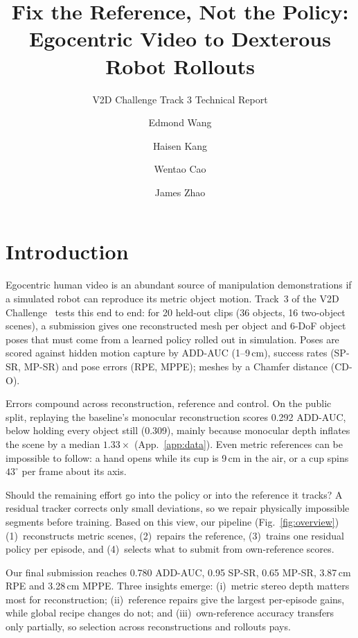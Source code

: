 \documentclass[10pt]{nvidiaextabstract}
\title{Fix the Reference, Not the Policy: Egocentric Video to Dexterous Robot Rollouts}
\subtitle{V2D Challenge Track 3 Technical Report}
\author[1*]{Edmond Wang}
\author[1*]{Haisen Kang}
\author[1*]{Wentao Cao}
\author[1*]{James Zhao}
\author[1]{\todo{Add remaining authors or remove}}
\affil[1]{Carnegie Mellon University}
\affil[ ]{\texttt{\{edmondwa, haisenk, wentaoc, jameszh2\}@andrew.cmu.edu}}
\begin{document}
\maketitle

\section{Introduction}
\label{sec:intro}

Egocentric human video is an abundant source of manipulation demonstrations if a simulated robot can reproduce its metric object motion. Track~3 of the V2D Challenge~\cite{v2d,v2ddata} tests this end to end: for 20 held-out clips (36 objects, 16 two-object scenes), a submission gives one reconstructed mesh per object and 6-DoF object poses that must come from a learned policy rolled out in simulation. Poses are scored against hidden motion capture by ADD-AUC (1--9\,cm), success rates (SP-SR, MP-SR) and pose errors (RPE, MPPE); meshes by a Chamfer distance (CD-O).

Errors compound across reconstruction, reference and control. On the public split, replaying the baseline's monocular reconstruction scores 0.292 ADD-AUC, below holding every object still (0.309), mainly because monocular depth inflates the scene by a median $1.33\times$ (App.~\ref{app:data}). Even metric references can be impossible to follow: a hand opens while its cup is 9\,cm in the air, or a cup spins $43^\circ$ per frame about its axis.

Should the remaining effort go into the policy or into the reference it tracks? A residual tracker corrects only small deviations, so we repair physically impossible segments before training. Based on this view, our pipeline (Fig.~\ref{fig:overview}) (1)~reconstructs metric scenes, (2)~repairs the reference, (3)~trains one residual policy per episode, and (4)~selects what to submit from own-reference scores.

Our final submission reaches 0.780 ADD-AUC, 0.95 SP-SR, 0.65 MP-SR, 3.87\,cm RPE and 3.28\,cm MPPE. Three insights emerge: (i)~metric stereo depth matters most for reconstruction; (ii)~reference repairs give the largest per-episode gains, while global recipe changes do not; and (iii)~own-reference accuracy transfers only partially, so selection across reconstructions and rollouts pays.
\end{document}
